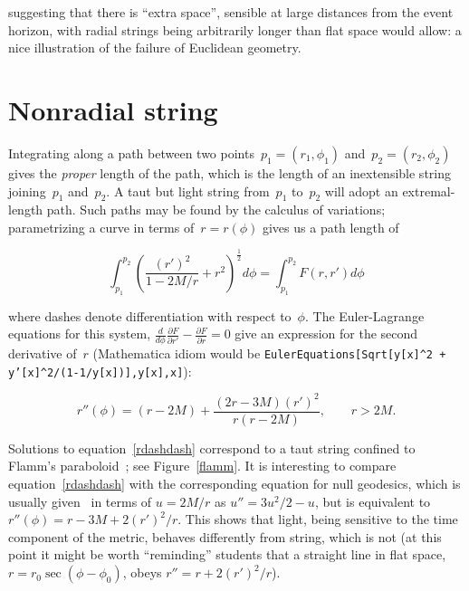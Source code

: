 \documentclass[review]{elsarticle}
\begin{document}
\noindent suggesting that there is ``extra space'', sensible at large
distances from the event horizon, with radial strings being
arbitrarily longer than flat space would allow: a nice illustration of
the failure of Euclidean geometry.

\section{Nonradial string}
Integrating along a path between two
points~$p_1=\left(r_1,\phi_1\right)$ and~$p_2=\left(r_2,\phi_2\right)$
gives the {\em proper} length of the path, which is the length of an
inextensible string joining~$p_1$ and~$p_2$.  A taut but light string
from~$p_1$ to~$p_2$ will adopt an extremal-length path.  Such paths
may be found by the calculus of variations; parametrizing a curve in
terms of~$r=r\left(\phi\right)$ gives us a path length of


\begin{equation}
  \int_{p_1}^{p_2}\left(\frac{\left(r'\right)^2}{1-2M/r} + r^2\right)^\frac{1}{2}d\phi=
  \int_{p_1}^{p_2}F\left(r,r'\right)d\phi
\end{equation}

\noindent where dashes denote differentiation with respect to~$\phi$.
The Euler-Lagrange equations for this system,
$\frac{d}{d\phi}\frac{\partial F}{\partial r'}-\frac{\partial
  F}{\partial r}=0$ give an expression for the second derivative
of~$r$ (Mathematica idiom would be {\tt EulerEquations[Sqrt[y[x]\^{}2
      + y'[x]\^{}2/(1-1/y[x])],y[x],x]}):

\begin{equation}\label{rdashdash}
  r''\left(\phi\right) =
  (r-2M) + \frac{(2r-3M)\left(r'\right)^2}{r\left(r-2M\right)},\qquad r>2M.
\end{equation}

\noindent Solutions to equation~\ref{rdashdash} correspond to a taut
string confined to Flamm's paraboloid~\cite{flamm1916}; see
Figure~\ref{flamm}.  It is interesting to compare
equation~\ref{rdashdash} with the corresponding equation for null
geodesics, which is usually given~\cite{wald} in terms of $u=2M/r$ as
$u''=3u^2/2-u$, but is equivalent
to~$r''\left(\phi\right)=r-3M+2\left(r'\right)^2/r$.  This shows that
light, being sensitive to the time component of the metric, behaves
differently from string, which is not (at this point it might be worth
``reminding'' students that a straight line in flat space,
$r=r_0\sec\left(\phi-\phi_0\right)$, obeys
$r''=r+2\left(r'\right)^2/r$).
\end{document}
